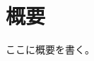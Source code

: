 \documentclass[12pt,a4paper,oneside,onecolumn,fleqn,dvipdfmx]{jreport}
\begin{document}
        \chapter*{概要}
            \thispagestyle{empty}
            ここに概要を書く。
    
    
\end{document}
